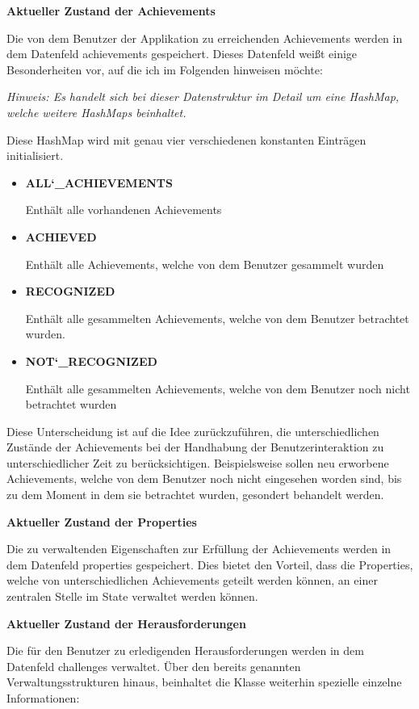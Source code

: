 \documentclass[bibliography=totoc,listof=totoc,BCOR=5mm,DIV=12,oneside]{scrbook}
\begin{document}
\newpage
\par \bigskip \textbf{Aktueller Zustand der Achievements}
\par Die von dem Benutzer der Applikation zu erreichenden Achievements werden in dem Datenfeld achievements gespeichert. Dieses Datenfeld weißt einige Besonderheiten vor, auf die ich im Folgenden hinweisen möchte:
\par \medskip  \textit{Hinweis: Es handelt sich bei dieser Datenstruktur im Detail um eine HashMap, welche weitere HashMaps beinhaltet.}
\par \medskip Diese HashMap wird mit genau vier verschiedenen konstanten Einträgen initialisiert.
\begin{itemize}
\item \textbf{ALL\char`_ACHIEVEMENTS}
\par Enthält alle vorhandenen Achievements
\item \textbf{ACHIEVED}
\par Enthält alle Achievements, welche von dem Benutzer gesammelt wurden
\item \textbf{RECOGNIZED}
\par Enthält alle gesammelten Achievements, welche von dem Benutzer betrachtet wurden.
\item \textbf{NOT\char`_RECOGNIZED}
\par Enthält alle gesammelten Achievements, welche von dem Benutzer noch nicht betrachtet wurden
\end{itemize}

\par Diese Unterscheidung ist auf die Idee zurückzuführen, die unterschiedlichen Zustände der Achievements bei der Handhabung der Benutzerinteraktion zu unterschiedlicher Zeit zu berücksichtigen. Beispielsweise sollen neu erworbene Achievements, welche von dem Benutzer noch nicht eingesehen worden sind, bis zu dem Moment in dem sie betrachtet wurden, gesondert behandelt werden.

\par \bigskip \textbf{Aktueller Zustand der Properties}
\par Die zu verwaltenden Eigenschaften zur Erfüllung der Achievements werden in dem Datenfeld properties gespeichert. Dies bietet den Vorteil, dass die Properties, welche von unterschiedlichen Achievements geteilt werden können, an einer zentralen Stelle im State verwaltet werden können.

\par \bigskip \textbf{Aktueller Zustand der Herausforderungen}
\par Die für den Benutzer zu erledigenden Herausforderungen werden in dem Datenfeld challenges verwaltet.
Über den bereits genannten Verwaltungsstrukturen hinaus, beinhaltet die Klasse weiterhin spezielle einzelne Informationen:
\end{document}
